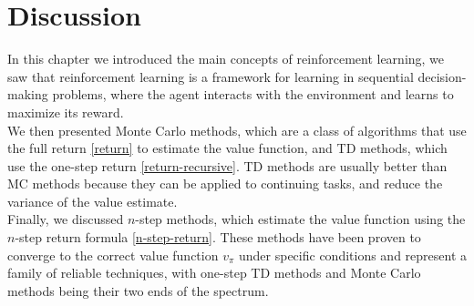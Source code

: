 \section{Discussion}
In this chapter we introduced the main concepts of reinforcement learning, we saw that reinforcement learning is a framework for learning in sequential decision-making problems, where the agent interacts with the environment and learns to maximize its reward.\\
We then presented Monte Carlo methods, which are a class of algorithms that use the full return \eqref{return} to estimate the value function, and TD methods, which use the one-step return \eqref{return-recursive}. TD methods are usually better than MC methods because they can be applied to continuing tasks, and reduce the variance of the value estimate.\\
Finally, we discussed $n$-step methods, which estimate the value function using the $n$-step return formula \eqref{n-step-return}. These methods have been proven to converge to the correct value function $v_{\pi}$ under specific conditions and represent a family of reliable techniques, with one-step TD methods and Monte Carlo methods being their two ends of the spectrum.
